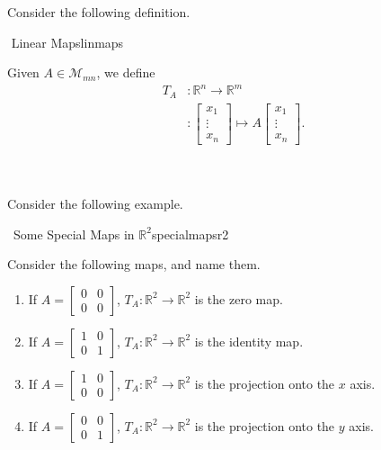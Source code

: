         Consider the following definition.
        \begin{definition}{\Stop\,\,Linear Maps}{linmaps}
        
            Given \(A\in\mathcal{M}_{mn}\), we define
            \begin{align*}
                T_A&:\mathbb{R}^n\to\mathbb{R}^m \\
                &:\begin{bmatrix} x_1 \\ \vdots \\ x_n \end{bmatrix}\mapsto A\begin{bmatrix} x_1 \\ \vdots \\ x_n \end{bmatrix}.
            \end{align*}
            
        \end{definition}
        \vphantom
        \\
        \\
        Consider the following example.
        \begin{example}{\Difficulty\,\Difficulty\,\,Some Special Maps in \(\mathbb{R}^2\)}{specialmapsr2}
            
            Consider the following maps, and name them.
            \begin{enumerate}
                \item If \(A=\begin{bmatrix} 0 & 0 \\ 0 & 0 \end{bmatrix}\), \(T_A:\mathbb{R}^2\to\mathbb{R}^2\) is the zero map.
                \item If \(A=\begin{bmatrix} 1 & 0 \\ 0 & 1 \end{bmatrix}\), \(T_A:\mathbb{R}^2\to\mathbb{R}^2\) is the identity map.
                \item If \(A=\begin{bmatrix} 1 & 0 \\ 0 & 0 \end{bmatrix}\), \(T_A:\mathbb{R}^2\to\mathbb{R}^2\) is the projection onto the \(x\) axis.
                \item If \(A=\begin{bmatrix} 0 & 0 \\ 0 & 1 \end{bmatrix}\), \(T_A:\mathbb{R}^2\to\mathbb{R}^2\) is the projection onto the \(y\) axis.
            \end{enumerate}
            
        \end{example}
        


